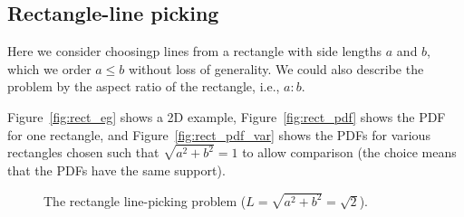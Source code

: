 \subsection{Rectangle-line picking}
\label{sec:rectangle_line}


Here we consider choosingp lines from a rectangle with side lengths
$a$ and $b$, which we order $a \leq b$ without loss of generality. 
We could also describe the problem by the aspect ratio of the
rectangle, i.e., $a \!: \!b$.

Figure~\ref{fig:rect_eg} shows a 2D example, Figure~\ref{fig:rect_pdf}
shows the PDF for one rectangle, and Figure~\ref{fig:rect_pdf_var}
shows the PDFs for various rectangles chosen such that $\sqrt{a^2 +
  b^2} = 1$ to allow comparison (the choice means that the PDFs have
the same support).

\begin{figure}[htbp]
  \begin{center}
       \hspace{0.075\columnwidth}
    \caption{The rectangle line-picking problem ($L=\sqrt{a^2+b^2}=\sqrt{2}$).}
  \end{center} 
\vspace{-4mm}
\end{figure}

